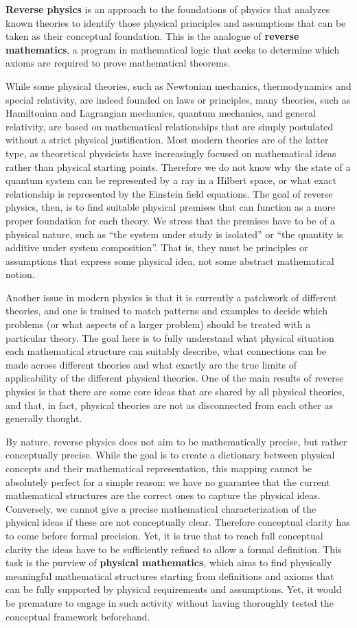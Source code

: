 \textbf{Reverse physics} is an approach to the foundations of physics that analyzes known theories to identify those physical principles and assumptions that can be taken as their conceptual foundation. This is the analogue of \textbf{reverse mathematics}, a program in mathematical logic that seeks to determine which axioms are required to prove mathematical theorems.

While some physical theories, such as Newtonian mechanics, thermodynamics and special relativity, are indeed founded on laws or principles, many theories, such as Hamiltonian and Lagrangian mechanics, quantum mechanics, and general relativity, are based on mathematical relationships that are simply postulated without a strict physical justification. Most modern theories are of the latter type, as theoretical physicists have increasingly focused on mathematical ideas rather than physical starting points. Therefore we do not know why the state of a quantum system can be represented by a ray in a Hilbert space, or what exact relationship is represented by the Einstein field equations. The goal of reverse physics, then, is to find suitable physical premises that can function as a more proper foundation for each theory. We stress that the premises have to be of a physical nature, such as ``the system under study is isolated'' or ``the quantity is additive under system composition''. That is, they must be principles or assumptions that express some physical idea, not some abstract mathematical notion.

Another issue in modern physics is that it is currently a patchwork of different theories, and one is trained to match patterns and examples to decide which problems (or what aspects of a larger problem) should be treated with a particular theory. The goal here is to fully understand what physical situation each mathematical structure can suitably describe, what connections can be made across different theories and what exactly are the true limits of applicability of the different physical theories. One of the main results of reverse physics is that there are some core ideas that are shared by all physical theories, and that, in fact, physical theories are not as disconnected from each other as generally thought.

By nature, reverse physics does not aim to be mathematically precise, but rather conceptually precise. While the goal is to create a dictionary between physical concepts and their mathematical representation, this mapping cannot be absolutely perfect for a simple reason: we have no guarantee that the current mathematical structures are the correct ones to capture the physical ideas. Conversely, we cannot give a precise mathematical characterization of the physical ideas if these are not conceptually clear. Therefore conceptual clarity has to come before formal precision. Yet, it is true that to reach full conceptual clarity the ideas have to be sufficiently refined to allow a formal definition. This task is the purview of \textbf{physical mathematics}, which aims to find physically meaningful mathematical structures starting from definitions and axioms that can be fully supported by physical requirements and assumptions. Yet, it would be premature to engage in such activity without having thoroughly tested the conceptual framework beforehand.
